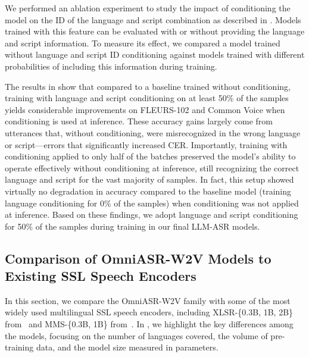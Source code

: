 \documentclass[]{fairmeta}
\begin{document}
We performed an ablation experiment to study the impact of conditioning the model on the ID of the language and script combination as described in . Models trained with this feature can be evaluated with or without providing the language and script information. To measure its effect, we compared a model trained without language and script ID conditioning against models trained with different probabilities of including this information during training. 

The results in  show that compared to a baseline trained without conditioning, training with language and script conditioning on at least 50\% of the samples yields considerable improvements on FLEURS-102 and Common Voice when conditioning is used at inference. These accuracy gains largely come from utterances that, without conditioning, were misrecognized in the wrong language or script—errors that significantly increased CER. Importantly, training with conditioning applied to only half of the batches preserved the model’s ability to operate effectively without conditioning at inference, still recognizing the correct language and script for the vast majority of samples. In fact, this setup showed virtually no degradation in accuracy compared to the baseline model (training language conditioning for 0\% of the samples) when conditioning was not applied at inference. Based on these findings, we adopt language and script conditioning for 50\% of the samples during training in our final LLM-ASR models.

\subsection{Comparison of OmniASR-W2V Models to Existing SSL Speech Encoders}
\label{sec:ssl_compare}

In this section, we compare the OmniASR-W2V family with some of the most widely used multilingual SSL speech encoders, including XLSR-\{0.3B, 1B, 2B\} from~\citet{babu2021xls} and MMS-\{0.3B, 1B\} from~\citet{pratap2024scaling}.  In , we highlight the key differences among the models, focusing on the number of languages covered, the volume of pre-training data, and the model size measured in parameters.
\end{document}
